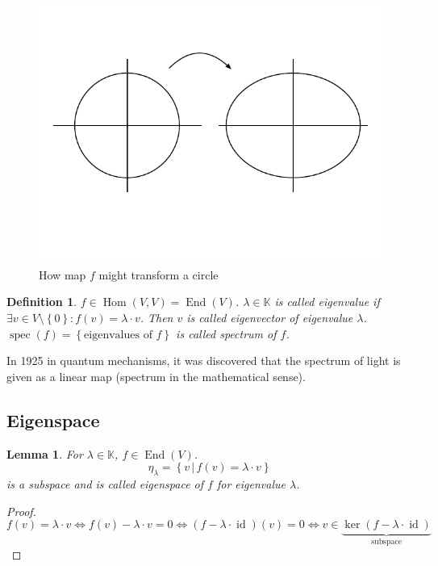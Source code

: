 \documentclass{article}
\newcounter{lecref}[section]
\numberwithin{lecref}{section}
\newtheorem{definition}[lecref]{Definition}
\newtheorem{lemma}[lecref]{Lemma}
\newcommand{\set}[1]{\left\{#1\right\}}
\newcommand{\setdef}[2]{\left\{\left.#1\,\right|\,#2\right\}}
\begin{document}
\begin{figure}[t]
  \begin{center}
    \includegraphics{img/15_screwing_map.pdf}
    \caption{How map $f$ might transform a circle}
  \end{center}
\end{figure}

\begin{definition} %
  $f \in \operatorname{Hom}(V, V) = \operatorname{End}(V)$.
  $\lambda \in \mathbb K$ is called \emph{eigenvalue} if
  $\exists v \in V \setminus \set{0}: f(v) = \lambda \cdot v$.
  Then $v$ is called \emph{eigenvector} of eigenvalue $\lambda$.
  $\operatorname{spec}(f) = \set{\text{eigenvalues of } f}$ is called \emph{spectrum of $f$}.
\end{definition}

In 1925 in quantum mechanisms, it was discovered that the spectrum of light is given as a linear map (spectrum in the mathematical sense).

\subsection{Eigenspace}

\begin{lemma}
  For $\lambda \in \mathbb K$, $f \in \operatorname{End}(V)$.
  \[ \eta_{\lambda} = \setdef{v}{f(v) = \lambda \cdot v} \]
  is a subspace and is called eigenspace of $f$ for eigenvalue $\lambda$.
\end{lemma}
\begin{proof}
  \[  f(v) = \lambda \cdot v \iff f(v) - \lambda \cdot v = 0
      \iff (f - \lambda \cdot \operatorname{id}) (v) = 0
      \iff v \in \underbrace{\operatorname{ker}(f - \lambda \cdot \operatorname{id})}_{\text{subspace}}
  \]
\end{proof}
\end{document}

